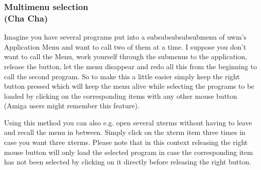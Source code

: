 \documentclass[10pt,a4paper]{article}
\begin{document}
\subsubsection{Multimenu selection\\\rm(Cha Cha)}
Imagine you have several programs put into a subsubsubsubsubmenu of uwm's \textsf{Application Menu} and want to call two of them at a time. I suppose you don't want to call the Menu, work yourself through the submenus to the application, release the button, let the menu disappear and redo all this from the beginning to call the second program. So to make this a little easier simply keep the right button pressed which will keep the menu alive while selecting the programs to be loaded by clicking on the corresponding items with any other mouse button (Amiga users might remember this feature).

Using this method you can also e.g. open several xterms without having to leave and recall the menu in between. Simply click on the xterm item three times in case you want three xterms. Please note that in this context releasing the right mouse button will only load the selected program in case the corresponding item has not been selected by clicking on it directly before releasing the right button.
\end{document}

